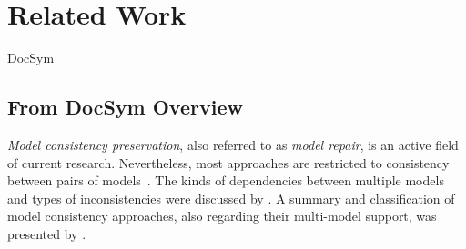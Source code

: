 \chapter{Related Work
}
\label{chap:relatedwork}


\begin{copiedFrom}{DocSym}

\section{From DocSym Overview}
\emph{Model consistency preservation}, also referred to as %
\emph{model repair}, is an active field of current research. 
Nevertheless, most approaches are restricted to consistency between pairs of models~\cite{stevens2020BidirectionalTransformationLarge-SoSym}.
The kinds of dependencies between multiple models and types of inconsistencies were discussed by \textcite{kolovos2008a}. 
A summary and classification of model consistency approaches, also regarding their multi-model support, was presented by \textcite{macedo2015a}.


\end{copiedFrom}
